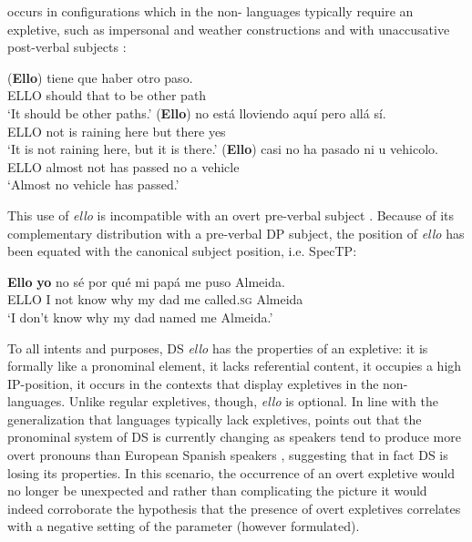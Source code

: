 \documentclass[output=paper]{LSP/langsci}
\begin{document}
  occurs in configurations which in the non- languages typically require an expletive, such as impersonal and weather constructions and with unaccusative post-verbal subjects \citep{BullockEtAl2009,Martínez2011,Muñoz2014,GuptonEtAl2014}:

\settowidth{}
\ea%
    \label{ex:Greco:8}
    \citep[156]{Muñoz2014}
    \ea \gll (\textbf{Ello})   tiene    que  haber    otro    paso.\\
	ELLO  should  that  {to be}    other    path\\
    \glt ‘It should be other paths.’
    \ex \gll (\textbf{Ello})  no  está  lloviendo  aquí  pero  allá    sí.\\
	      ELLO  not  is  raining  here  but  there    yes\\
	 \glt ‘It is not raining here, but it is there.’ 
    \ex \gll (\textbf{Ello})   casi     no   ha pasado   ni   u   vehicolo.\\
	      ELLO almost   not   has passed   no   a   vehicle\\
	\glt ‘Almost no vehicle has passed.’
    \z
\z

This use of \textit{ello} is incompatible with an overt pre-verbal subject \citep[65]{Martínez2011}. Because of its complementary distribution with a pre-verbal DP subject, the position of \textit{ello} has been equated with the canonical subject position, i.e. SpecTP:

\ea%
    \label{ex:Greco:9}
    \citep[65]{Martínez2011}
    \gll {\upshape *} \textbf{Ello} \textbf{yo}   no   sé   {por qué}   mi papá   me puso    Almeida.\\
	      {} ELLO  I   not   know why          my dad   me called.\textsc{sg}  Almeida\\
    \glt {}`I don't know why my dad named me Almeida.'
    \z

To all intents and purposes, DS \textit{ello} has the properties of an expletive: it is formally like a pronominal element, it lacks referential content, it occupies a high IP-position, it occurs in the contexts that display expletives in the non- languages. Unlike regular expletives, though, \textit{ello} is optional. In line with the generalization that  languages typically lack expletives, \citet{Muñoz2014} points out that the pronominal system of DS is currently changing as speakers tend to produce more overt pronouns than European Spanish speakers \citep{OtheguyEtAl2007}, suggesting that in fact DS is losing its  properties. In this scenario, the occurrence of an overt expletive would no longer be unexpected and rather than complicating the picture it would indeed corroborate the hypothesis that the presence of overt expletives correlates with a negative setting of the  parameter (however formulated).
\end{document}
